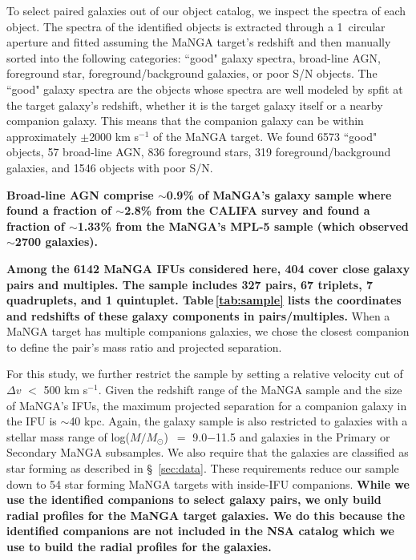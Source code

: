 \documentclass[iop,revtex4,twocolumn,apj,numberedappendix,appendixfloats]{emulateapj}
\newcommand{\logm}{log($M/M_{\odot}$)}
\begin{document}
To select paired galaxies out of our object catalog, we inspect the spectra of each object. The spectra of the identified objects is extracted through a 1\arcsec\ circular aperture and fitted assuming the MaNGA target's redshift and then manually sorted into the following categories: ``good" galaxy spectra, broad-line AGN, foreground star, foreground/background galaxies, or poor S/N objects. The ``good" galaxy spectra are the objects whose spectra are well modeled by {\sc spfit} at the target galaxy's redshift, whether it is the target galaxy itself or a nearby companion galaxy. This means that the companion galaxy can be within approximately $\pm$2000 km s$^{-1}$ of the MaNGA target. We found 6573 ``good" objects, 57 broad-line AGN, 836 foreground stars, 319 foreground/background galaxies, and 1546 objects with poor S/N. 

\textbf{Broad-line AGN comprise $\sim$0.9\% of MaNGA's galaxy sample where \citet{Lacerda:2020} found a fraction of $\sim$2.8\% from the CALIFA survey and \citet{Sanchez:2018} found a fraction of $\sim$1.33\% from the MaNGA's MPL-5 sample (which observed $\sim$2700 galaxies).  
}

{\bf Among the 6142 MaNGA IFUs considered here, 404 cover close galaxy pairs and multiples. The sample includes 327 pairs, 67 triplets, 7 quadruplets, and 1 quintuplet. Table\,\ref{tab:sample} lists the coordinates and redshifts of these galaxy components in pairs/multiples.} When a MaNGA target has multiple companions galaxies, we chose the closest companion to define the pair's mass ratio and projected separation.

For this study, we further restrict the sample by setting a relative velocity cut of $\Delta v$ $<$ 500 km s$^{-1}$. Given the redshift range of the MaNGA sample and the size of MaNGA's IFUs, the maximum projected separation for a companion galaxy in the IFU is $\sim$40 kpc. Again, the galaxy sample is also restricted to galaxies with a stellar mass range of \logm\ $=$ 9.0$-$11.5 and galaxies in the Primary or Secondary MaNGA subsamples. We also require that the galaxies are classified as star forming as described in \S~\ref{sec:data}. These requirements reduce our sample down to 54 star forming MaNGA targets with inside-IFU companions. \textbf{While we use the identified companions to select galaxy pairs, we only build radial profiles for the MaNGA target galaxies. We do this because the identified companions are not included in the NSA catalog which we use to build the radial profiles for the galaxies.}
\end{document}
